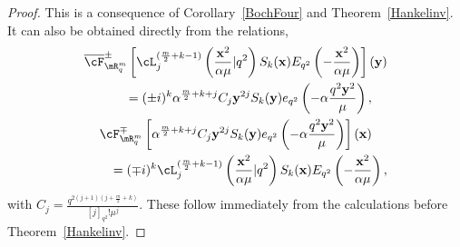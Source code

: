 \begin{proof}
This is a consequence of Corollary~\ref{BochFour} and Theorem~\ref{Hankelinv}. It can also be obtained directly from the relations,
\begin{gather*}
\overline{\cF}^{\pm}_{\mR^m_q}\left[\cL_j^{(\frac{m}{2}+k-1)}\left(\frac{\bold{x}^2}{\alpha\mu}|q^2\right)
S_k(\bold{x})E_{q^2}\left(-\frac{\bold{x}^2}{\alpha\mu}\right)\right](\bold{y})\\
 \qquad{} = (\pm i)^k\alpha^{\frac{m}{2}+k+j}C_j\bold{y}^{2j}S_k(\bold{y})e_{q^2}\left(-\alpha\frac{q^2\bold{y}^2}{\mu}\right),\\
\cF^{\mp}_{\mR^m_q}\left[\alpha^{\frac{m}{2}+k+j}C_j\bold{y}^{2j}S_k(\bold{y})e_{q^2}\left(-\alpha\frac{q^2\bold{y}^2}{\mu}\right)\right](\bold{x})\\
 \qquad{} = (\mp i)^k\cL_j^{(\frac{m}{2}+k-1)}\left(\frac{\bold{x}^2}{\alpha\mu}|q^2\right)S_k(\bold{x})E_{q^2}\left(-\frac{\bold{x}^2}{\alpha\mu}\right),
\end{gather*}
with $C_j=\frac{q^{2(j+1)(j+\frac{m}{2}+k)}}{[j]_{q^2}!\mu^j}$. These follow immediately from the calculations before Theorem~\ref{Hankelinv}.
\end{proof}
